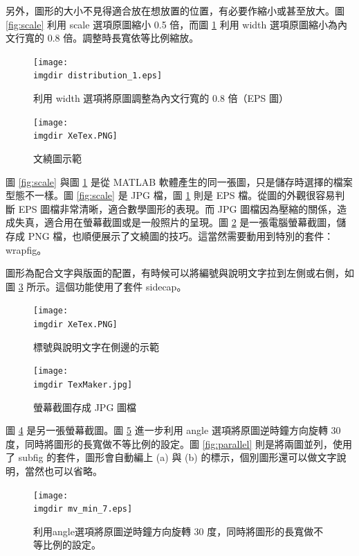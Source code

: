 另外，圖形的大小不見得適合放在想放置的位置，有必要作縮小或甚至放大。圖 \ref{fig:scale}  利用  scale 選項原圖縮小 0.5 倍，而圖 \ref{fig:width} 利用 width 選項原圖縮小為內文行寬的 0.8 倍。調整時長寬依等比例縮放。\\

\begin{figure}[H]
    \centering
    \texttt{[image: \\imgdir distribution\_1.eps]}
    \caption{利用 width 選項將原圖調整為內文行寬的 0.8 倍（EPS 圖）}
    \label{fig:width}
\end{figure}

\begin{figure}
\centering
\texttt{[image: \\imgdir XeTex.PNG]}
\caption{文繞圖示範}\label{fig:PNG}
\end{figure}

圖 \ref{fig:scale} 與圖  \ref{fig:width} 是從 MATLAB 軟體產生的同一張圖，只是儲存時選擇的檔案型態不一樣。圖 \ref{fig:scale} 是 JPG 檔，圖  \ref{fig:width} 則是 EPS 檔。從圖的外觀很容易判斷 EPS 圖檔非常清晰，適合數學圖形的表現。而 {\C JPG} 圖檔因為壓縮的關係，造成失真，適合用在螢幕截圖或是一般照片的呈現。圖 \ref{fig:PNG} 是一張電腦螢幕截圖，儲存成 PNG 檔，也順便展示了文繞圖的技巧。這當然需要動用到特別的套件：wrapfig。

圖形為配合文字與版面的配置，有時候可以將編號與說明文字拉到左側或右側，如圖 \ref{fig:side} 所示。這個功能使用了套件 sidecap。
\begin{figure}  %
\caption{標號與說明文字在側邊的示範}
\texttt{[image: \\imgdir XeTex.PNG]}
\label{fig:side}
\end{figure}


\begin{figure}[h]
    \centering
        \texttt{[image: \\imgdir TexMaker.jpg]}
    \caption{螢幕截圖存成 JPG 圖檔}
    \label{fig:JPG}
\end{figure}

圖 \ref{fig:JPG} 是另一張螢幕截圖。圖 \ref{fig:angle} 進一步利用 angle 選項將原圖逆時鐘方向旋轉 30 度，同時將圖形的長寬做不等比例的設定。圖 \ref{fig:parallel} 則是將兩圖並列，使用了 subfig 的套件，圖形會自動編上 (a) 與 (b) 的標示，個別圖形還可以做文字說明，當然也可以省略。

\begin{figure}[H]
    \centering
        \texttt{[image: \\imgdir mv\_min\_7.eps]}
    \caption{利用angle選項將原圖逆時鐘方向旋轉 30 度，同時將圖形的長寬做不等比例的設定。}
    \label{fig:angle}
\end{figure}

